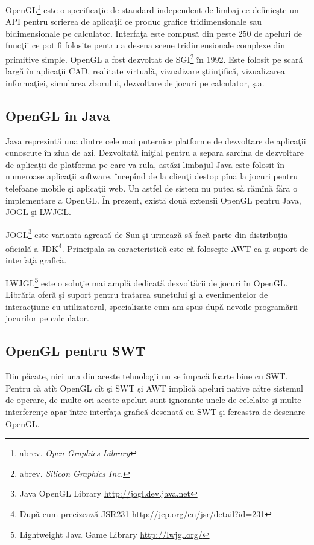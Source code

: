 OpenGL\footnote{abrev. \textit{Open Graphics Library}} este o specificaţie de 
standard independent de limbaj ce definieşte un API pentru scrierea de 
aplicaţii ce produc grafice tridimensionale sau bidimensionale pe calculator. 
Interfaţa este compusă din peste 250 de apeluri de funcţii ce pot fi folosite 
pentru a desena scene tridimensionale complexe din primitive simple. OpenGL a 
fost dezvoltat de SGI\footnote{abrev. \textit{Silicon Graphics Inc.}} în 1992. 
Este folosit pe scară largă în aplicaţii CAD, realitate virtuală, vizualizare 
ştiinţifică, vizualizarea informaţiei, simularea zborului, dezvoltare de jocuri 
pe calculator, ş.a. \cite{oglwiki}

\subsection{OpenGL în Java}
Java reprezintă una dintre cele mai puternice platforme de dezvoltare de 
aplicaţii cunoscute în ziua de azi. Dezvoltată iniţial pentru a separa sarcina 
de dezvoltare de aplicaţii de platforma pe care va rula, astăzi limbajul Java 
este folosit în numeroase aplicaţii software, începînd de la clienţi destop 
pînă la jocuri pentru telefoane mobile şi aplicaţii web. Un astfel de sistem nu 
putea să rămînă fără o implementare a OpenGL. În prezent, există două extensii 
OpenGL pentru Java, JOGL şi LWJGL.

JOGL\footnote{Java OpenGL Library \url{http://jogl.dev.java.net}} este varianta 
agreată de Sun şi urmează să facă parte din distribuţia oficială a 
JDK\footnote{După cum precizează JSR231 
\url{http://jcp.org/en/jsr/detail?id=231}}. Principala sa caracteristică este 
că foloseşte AWT ca şi suport de interfaţă grafică.

LWJGL\footnote{Lightweight Java Game Library \url{http://lwjgl.org/}} este o 
soluţie mai amplă dedicată dezvoltării de jocuri în OpenGL. Librăria oferă şi 
suport pentru tratarea sunetului şi a evenimentelor de interacţiune cu 
utilizatorul, specializate cum am spus după nevoile programării jocurilor pe 
calculator.

\subsection{OpenGL pentru SWT}

Din păcate, nici una din aceste tehnologii nu se împacă foarte bine cu SWT. 
Pentru că atît OpenGL cît şi SWT şi AWT implică apeluri native către sistemul 
de operare, de multe ori aceste apeluri sunt ignorante unele de celelalte şi 
multe interferenţe apar între interfaţa grafică desenată cu SWT şi fereastra de 
desenare OpenGL.

